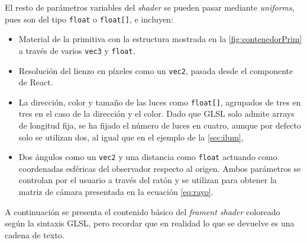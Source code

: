 El resto de parámetros variables del \textit{shader} se pueden pasar mediante \textit{uniforms}, pues son del tipo \texttt{float} o \texttt{float[]}, e incluyen:
\begin{itemize}
    \item Material de la primitiva con la estructura mostrada en la \autoref{fig:contenedorPrim} a través de varios \texttt{vec3} y \texttt{float}. 
    \item Resolución del lienzo en píxeles como un \texttt{vec2}, pasada desde el componente de React.
    \item La dirección, color y tamaño de las luces como \texttt{float[]}, agrupados de tres en tres en el caso de la dirección y el color. Dado que GLSL solo admite arrays de longitud fija, se ha fijado el número de luces en cuatro, aunque por defecto solo se utilizan dos, al igual que en el ejemplo de la \autoref{sec:ilum},
    \item Dos ángulos como un \texttt{vec2} y una distancia como \texttt{float} actuando como coordenadas esféricas del observador respecto al origen. Ambos parámetros se controlan por el usuario a través del ratón y se utilizan para obtener la matriz de cámara presentada en la ecuación \eqref{eq:rayo}.
\end{itemize}
A continuación se presenta el contenido básico del \textit{frament shader} coloreado según la sintaxis GLSL, pero recordar que en realidad lo que se devuelve es una cadena de texto.
